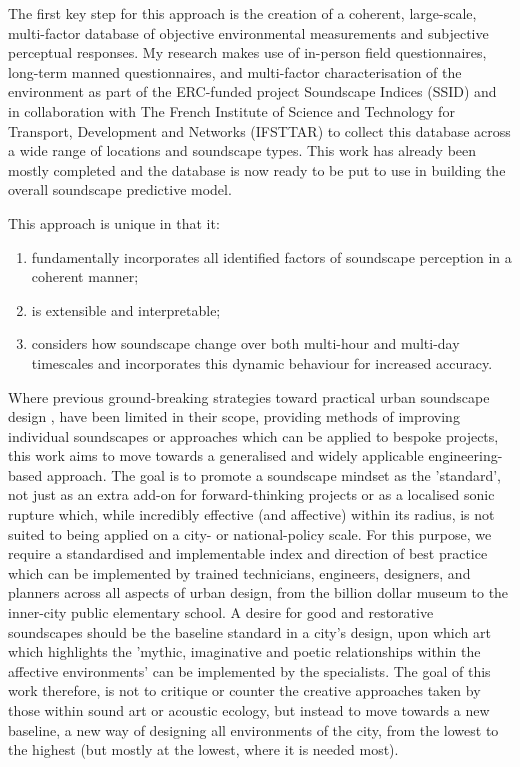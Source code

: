 The first key step for this approach is the creation of a coherent, large-scale, multi-factor database of objective environmental measurements and subjective perceptual responses. My research makes use of in-person field questionnaires, long-term manned questionnaires, and multi-factor characterisation of the environment as part of the ERC-funded project Soundscape Indices (SSID) and in collaboration with The French Institute of Science and Technology for Transport, Development and Networks (IFSTTAR) to collect this database across a wide range of locations and soundscape types. This work has already been mostly completed and the database is now ready to be put to use in building the overall soundscape predictive model.

This approach is unique in that it:
\begin{enumerate}
  \item fundamentally incorporates all identified factors of soundscape perception in a coherent manner;
  \item is extensible and interpretable;
  \item considers how soundscape change over both multi-hour and multi-day timescales and incorporates this dynamic behaviour for increased accuracy.
\end{enumerate}

Where previous ground-breaking strategies toward practical urban soundscape design \citep{Lacey2019Noise}, have been limited in their scope, providing methods of improving individual soundscapes or approaches which can be applied to bespoke projects, this work aims to move towards a generalised and widely applicable engineering-based approach. The goal is to promote a soundscape mindset as the 'standard', not just as an extra add-on for forward-thinking projects or as a localised sonic rupture which, while incredibly effective (and affective) within its radius, is not suited to being applied on a city- or national-policy scale. For this purpose, we require a standardised and implementable index and direction of best practice which can be implemented by trained technicians, engineers, designers, and planners across all aspects of urban design, from the billion dollar museum to the inner-city public elementary school. A desire for good and restorative soundscapes should be the baseline standard in a city's design, upon which art which highlights the 'mythic, imaginative and poetic relationships within the affective environments' \citep{Lacey2019Noise} can be implemented by the specialists. The goal of this work therefore, is not to critique or counter the creative approaches taken by those within sound art or acoustic ecology, but instead to move towards a new baseline, a new way of designing all environments of the city, from the lowest to the highest (but mostly at the lowest, where it is needed most).

